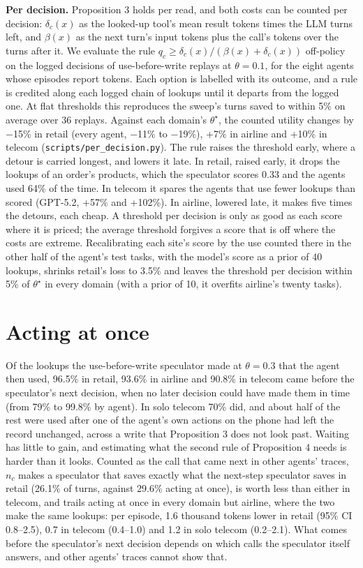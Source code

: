 \documentclass[10pt,twocolumn,letterpaper]{article}
\newcommand{\runin}[1]{{\sffamily\bfseries\color{accent}#1}}
\begin{document}
\runin{Per decision.} Proposition 3 holds per read, and both costs can be counted per decision: \(\delta_c(x)\) as the looked-up tool's mean result tokens times the LLM turns left, and \(\beta(x)\) as the next turn's input tokens plus the call's tokens over the turns after it. We evaluate the rule \(q_c \ge \delta_c(x)/(\beta(x)+\delta_c(x))\) off-policy on the logged decisions of use-before-write replays at \(\theta = 0.1\), for the eight agents whose episodes report tokens. Each option is labelled with its outcome, and a rule is credited along each logged chain of lookups until it departs from the logged one. At flat thresholds this reproduces the sweep's turns saved to within 5\% on average over 36 replays. Against each domain's \(\theta^\star\), the counted utility changes by −15\% in retail (every agent, −11\% to −19\%), +7\% in airline and +10\% in telecom (\texttt{scripts/per\_decision.py}). The rule raises the threshold early, where a detour is carried longest, and lowers it late. In retail, raised early, it drops the lookups of an order's products, which the speculator scores 0.33 and the agents used 64\% of the time. In telecom it spares the agents that use fewer lookups than scored (GPT-5.2, +57\% and +102\%). In airline, lowered late, it makes five times the detours, each cheap. A threshold per decision is only as good as each score where it is priced; the average threshold forgives a score that is off where the costs are extreme. Recalibrating each site's score by the use counted there in the other half of the agent's test tasks, with the model's score as a prior of 40 lookups, shrinks retail's loss to 3.5\% and leaves the threshold per decision within 5\% of \(\theta^\star\) in every domain (with a prior of 10, it overfits airline's twenty tasks).

\hypertarget{acting-at-once}{%
\section{Acting at once}\label{acting-at-once}}

Of the lookups the use-before-write speculator made at \(\theta = 0.3\) that the agent then used, 96.5\% in retail, 93.6\% in airline and 90.8\% in telecom came before the speculator's next decision, when no later decision could have made them in time (from 79\% to 99.8\% by agent). In solo telecom 70\% did, and about half of the rest were used after one of the agent's own actions on the phone had left the record unchanged, across a write that Proposition 3 does not look past. Waiting has little to gain, and estimating what the second rule of Proposition 4 needs is harder than it looks. Counted as the call that came next in other agents' traces, \(n_c\) makes a speculator that saves exactly what the next-step speculator saves in retail (26.1\% of turns, against 29.6\% acting at once), is worth less than either in telecom, and trails acting at once in every domain but airline, where the two make the same lookups: per episode, 1.6 thousand tokens lower in retail (95\% CI 0.8--2.5), 0.7 in telecom (0.4--1.0) and 1.2 in solo telecom (0.2--2.1). What comes before the speculator's next decision depends on which calls the speculator itself answers, and other agents' traces cannot show that.
\end{document}
